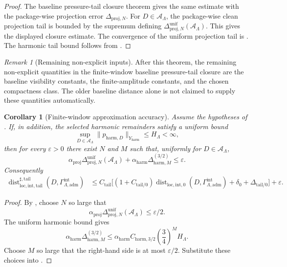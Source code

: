 \documentclass[11pt]{article}
\numberwithin{equation}{section}
\newtheorem{corollary}[corollary]{Corollary}
\theoremstyle{definition}
\theoremstyle{remark}
\newtheorem{remark}[remark]{Remark}
\newcommand{\loc}{\mathrm{loc}}
\newcommand{\intg}{\mathrm{int}}
\newcommand{\tail}{\mathrm{tail}}
\newcommand{\adm}{\mathrm{adm}}
\newcommand{\proj}{\mathrm{proj}}
\newcommand{\harm}{\mathrm{harm}}
\newcommand{\Dist}{\operatorname{dist}}
\newcommand{\Gammaadm}{\Gamma^{\intg}_{\Lambda,\adm}}
\begin{document}
\begin{proof}
The baseline pressure-tail closure theorem
 gives the same estimate with the
package-wise projection error \(\Delta_{\proj,N}\).  For
\(D\in\mathcal A_\Lambda\), the package-wise clean projection tail is
bounded by the supremum defining
\(\Delta^{\mathrm{unif}}_{\proj,N}(\mathcal A_\Lambda)\).  This gives
the displayed closure estimate.  The convergence of the uniform projection
tail is .  The harmonic tail bound follows from .
\end{proof}

\begin{remark}[Remaining non-explicit inputs]
After this theorem, the remaining non-explicit quantities in the finite-window
baseline pressure-tail closure are the baseline visibility constants, the
finite-amplitude constants, and the chosen compactness class.  The older
baseline distance alone is not claimed to supply these quantities
automatically.
\end{remark}

\begin{corollary}[Finite-window approximation accuracy]
\label{cor:finite-window-epsilon-accuracy}
Assume the hypotheses of
.  If, in addition, the
selected harmonic remainders satisfy a uniform bound
\[
    \sup_{D\in\mathcal A_\Lambda}\|p_{\harm,D}\|_{Y_{\harm}}
    \le H_\Lambda<\infty,
\]
then for every \(\varepsilon>0\) there exist \(N\) and \(M\) such that,
uniformly for \(D\in\mathcal A_\Lambda\),
\[
    \alpha_{\proj}
    \Delta^{\mathrm{unif}}_{\proj,N}(\mathcal A_\Lambda)
    +
    \alpha_{\harm}\Delta_{\harm,M}^{(3/2)}
    \le
    \varepsilon.
\]
Consequently
\[
\begin{aligned}
    \Dist^{\sharp,\tail}_{\loc,\intg,\tail}(D,\Gammaadm)
    &\le
    C_{\tail}
    \bigl[
        (1+C_{\tail/0})
        \Dist_{\loc,\intg,0}(D,\Gammaadm)
        +
        \delta_0
        +
        \Delta_{\tail/0}
    \bigr]
    +
    \varepsilon .
\end{aligned}
\]
\end{corollary}

\begin{proof}
By , choose \(N\) so large
that
\[
    \alpha_{\proj}
    \Delta^{\mathrm{unif}}_{\proj,N}(\mathcal A_\Lambda)
    \le \varepsilon/2.
\]
The uniform harmonic bound gives
\[
    \alpha_{\harm}\Delta_{\harm,M}^{(3/2)}
    \le
    \alpha_{\harm}
    C_{\harm,3/2}
    \left(\frac34\right)^M
    H_\Lambda.
\]
Choose \(M\) so large that the right-hand side is at most \(\varepsilon/2\).
Substitute these choices into
.
\end{proof}
\end{document}
